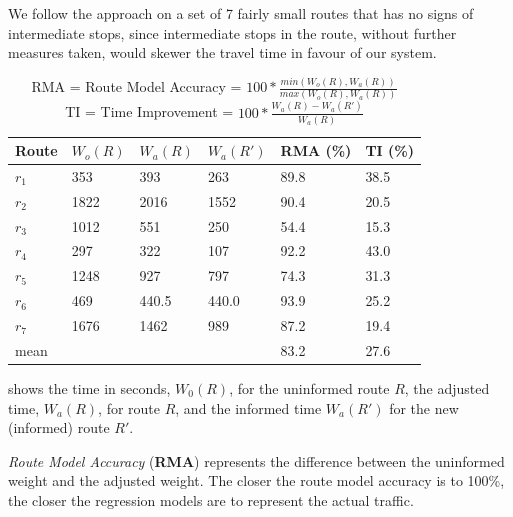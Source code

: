We follow the approach on a set of 7 fairly small routes that has no signs of intermediate stops, since intermediate stops in the route, without further measures taken, would skewer the travel time in favour of our system. 
\begin{table}[]
\centering
\begin{tabular}{llllll}
\textbf{Route} & \textbf{$W_o(R)$} & \textbf{$W_a(R)$}  & \textbf{$W_a(R')$} & \textbf{RMA (\%)} & \textbf{TI (\%)} \\ \hline
$r_1$          & 353               & 393                & 263                & 89.8                         & 38.5 \\
$r_2$          & 1822              & 2016               & 1552               & 90.4                         & 20.5 \\
$r_3$          & 1012              & 551                & 250                & 54.4                         & 15.3 \\
$r_4$          & 297               & 322                & 107                & 92.2                         & 43.0 \\
$r_5$          & 1248              & 927                & 797                & 74.3                         & 31.3 \\
$r_6$          & 469               & 440.5              & 440.0              & 93.9                         & 25.2 \\
$r_7$          & 1676              & 1462               & 989                & 87.2                         & 19.4 \\ \hline
mean       	   &                   &                    &                    & 83.2                         & 27.6
\end{tabular}
\caption{RMA = Route Model Accuracy = $100 * \frac{min(W_o(R), W_a(R))}{max(W_o(R), W_a(R))}$\\
	     TI = Time Improvement = $100 * \frac{W_a(R) - W_a(R')}{W_a(R)}$}
\label{tab:eval-results}
\end{table}

 shows the time in seconds, $W_0(R)$, for the uninformed route $R$, the adjusted time, $W_a(R)$, for route $R$, and the informed time $W_a(R')$ for the new (informed) route $R'$.

\emph{Route Model Accuracy } (\textbf{RMA}) represents the difference between the uninformed weight and the adjusted weight. The closer the route model accuracy is to 100\%, the closer the regression models are to represent the actual traffic.
 
